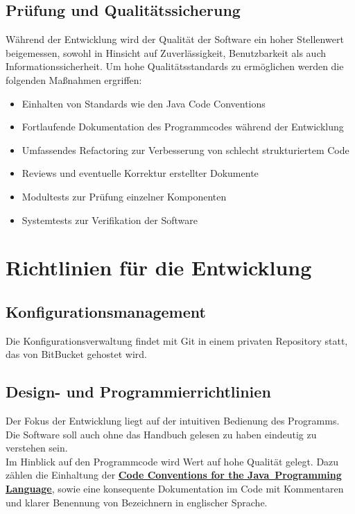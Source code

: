 \documentclass[11pt]{article}
\begin{document}
\subsection{Prüfung und Qualitätssicherung}

Während der Entwicklung wird der Qualität der Software ein hoher Stellenwert beigemessen, sowohl in Hinsicht auf Zuverlässigkeit, Benutzbarkeit als auch Informationssicherheit. Um hohe Qualitätsstandards zu ermöglichen werden die folgenden Maßnahmen ergriffen:
\begin{itemize}
	\item Einhalten von Standards wie den Java Code Conventions
	\item Fortlaufende Dokumentation des Programmcodes während der Entwicklung
	\item Umfassendes Refactoring zur Verbesserung von schlecht strukturiertem Code
	\item Reviews und eventuelle Korrektur erstellter Dokumente
	\item Modultests zur Prüfung einzelner Komponenten
	\item Systemtests zur Verifikation der Software
\end{itemize}

\section{Richtlinien für die Entwicklung}

\subsection{Konfigurationsmanagement}

Die Konfigurationsverwaltung findet mit Git in einem privaten Repository statt, das von BitBucket gehostet wird.

\subsection{Design- und Programmierrichtlinien}

Der Fokus der Entwicklung liegt auf der intuitiven Bedienung des Programms. Die Software soll auch ohne das Handbuch gelesen zu haben eindeutig zu verstehen sein.\\
Im Hinblick auf den Programmcode wird Wert auf hohe Qualität gelegt. Dazu zählen die Einhaltung der \href{http://www.oracle.com/technetwork/java/codeconvtoc-136057.html}{\textbf{Code Conventions for the Java\texttrademark\ Programming Language}}, sowie eine konsequente Dokumentation im Code mit Kommentaren und klarer Benennung von Bezeichnern in englischer Sprache.
\end{document}
